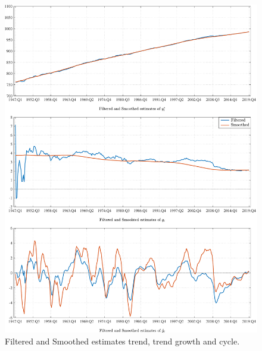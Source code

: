 \documentclass[a4paper,final,12pt]{article}
\begin{document}
\begin{figure}[p!]
\centering
\includegraphics[angle=00, width=1\textwidth,trim={0 0 0 0},clip]{Clark_SSM} \vspace*{-2.5mm}
\caption{Filtered and Smoothed estimates trend, trend growth and cycle.}
\label{fig:KFS}
\end{figure}
\end{document}
